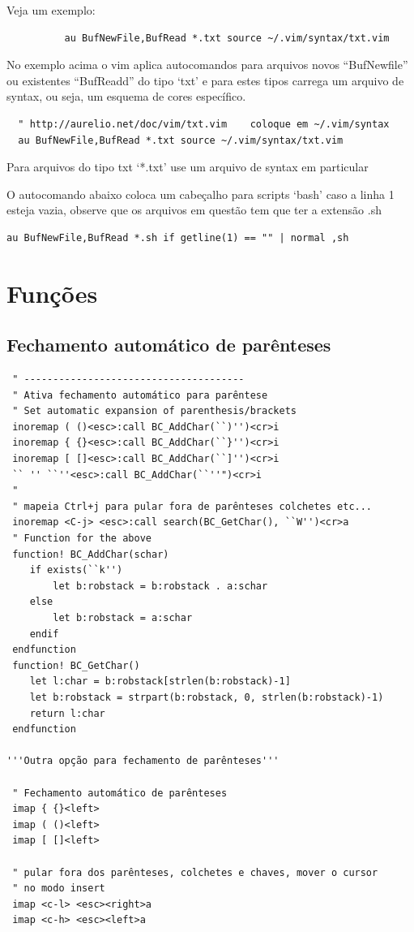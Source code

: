 \documentclass[10pt,a4paper,openany]{book}
\begin{document}
Veja um exemplo:

\begin{verbatim}
		  au BufNewFile,BufRead *.txt source ~/.vim/syntax/txt.vim
\end{verbatim}

No exemplo acima o vim aplica autocomandos para arquivos novos
``BufNewfile'' ou existentes ``BufReadd'' do tipo `txt' e para estes tipos
carrega um arquivo de syntax, ou seja, um esquema de cores específico.

\begin{verbatim}
  " http://aurelio.net/doc/vim/txt.vim    coloque em ~/.vim/syntax
  au BufNewFile,BufRead *.txt source ~/.vim/syntax/txt.vim
\end{verbatim}

Para arquivos do tipo txt `*.txt' use um arquivo de syntax em particular

O autocomando abaixo coloca um cabeçalho para scripts `bash' caso a
linha 1 esteja vazia, observe que os arquivos em questão tem que ter a
extensão .sh

\begin{verbatim}
au BufNewFile,BufRead *.sh if getline(1) == "" | normal ,sh
\end{verbatim}


\section{Funções}
\label{sec:Funções}

\subsection{Fechamento automático de parênteses}
\label{sec:Fechamento automático de parênteses}

\begin{verbatim}
 " --------------------------------------
 " Ativa fechamento automático para parêntese
 " Set automatic expansion of parenthesis/brackets
 inoremap ( ()<esc>:call BC_AddChar(``)'')<cr>i
 inoremap { {}<esc>:call BC_AddChar(``}'')<cr>i
 inoremap [ []<esc>:call BC_AddChar(``]'')<cr>i
 `` '' ``''<esc>:call BC_AddChar(``''")<cr>i
 "
 " mapeia Ctrl+j para pular fora de parênteses colchetes etc...
 inoremap <C-j> <esc>:call search(BC_GetChar(), ``W'')<cr>a
 " Function for the above
 function! BC_AddChar(schar)
    if exists(``k'')
        let b:robstack = b:robstack . a:schar
    else
        let b:robstack = a:schar
    endif
 endfunction
 function! BC_GetChar()
    let l:char = b:robstack[strlen(b:robstack)-1]
    let b:robstack = strpart(b:robstack, 0, strlen(b:robstack)-1)
    return l:char
 endfunction

'''Outra opção para fechamento de parênteses'''

 " Fechamento automático de parênteses
 imap { {}<left>
 imap ( ()<left>
 imap [ []<left>

 " pular fora dos parênteses, colchetes e chaves, mover o cursor
 " no modo insert
 imap <c-l> <esc><right>a
 imap <c-h> <esc><left>a
\end{verbatim}
\end{document}
